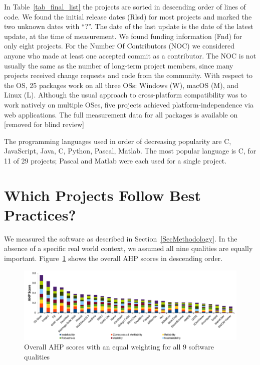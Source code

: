 \documentclass[doubleblind,12pt, 3p, times]{elsarticle}
\newcommand{\CC}{C\nolinebreak\hspace{-.05em}\raisebox{.4ex}{\small\bf
+}\nolinebreak\hspace{-.10em}\raisebox{.4ex}{\small\bf +}}
\begin{document}
In Table~\ref{tab_final_list} the projects are sorted in descending order of
lines of code.  We found the initial release dates (Rlsd) for most projects and
marked the two unknown dates with ``?''. The date of the last update is the date
of the latest update, at the time of measurement. We found funding information
(Fnd) for only eight projects.  For the Number Of Contributors (NOC) we
considered anyone who made at least one accepted commit as a contributor. The
NOC is not usually the same as the number of long-term project members, since
many projects received change requests and code from the community.  With
respect to the OS, 25 packages work on all three OSs: Windows (W), macOS (M),
and Linux (L). Although the usual approach to cross-platform compatibility was
to work natively on multiple OSes, five projects achieved platform-independence
via web applications. The full measurement data for all packages is available on
[removed for blind review]

The programming languages used in order of decreasing popularity are \CC,
JavaScript, Java, C, Python, Pascal, Matlab.  The most popular language is \CC,
for 11 of 29 projects; Pascal and Matlab were each used for a single project.

\section{Which Projects Follow Best Practices?} \label{SecMeasurementResults}

We measured the software as described in
Section~\ref{SecMethodology}.  In the absence of a specific real world context,
we assumed all nine qualities are equally important.
Figure~\ref{fg_overall_scores} shows the overall AHP scores in descending order.

\begin{figure}[ht!]
\includegraphics[scale=0.47]{overall_scores.pdf}
\caption{Overall AHP scores with an equal weighting for all 9 software qualities}

\label{fg_overall_scores}
\end{figure}
\end{document}
